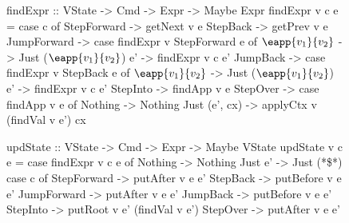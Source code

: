 \begin{figure}[t]
\begin{mcode}
findExpr :: VState -> Cmd -> Expr -> Maybe Expr
findExpr v c e = case c of
  StepForward -> getNext v e
  StepBack    -> getPrev v e
  JumpForward -> case findExpr v StepForward e of
    $\eapp{v_1}{v_2}$ -> Just ($\eapp{v_1}{v_2}$)
    e'   -> findExpr v c e'
  JumpBack    -> case findExpr v StepBack e of
    $\eapp{v_1}{v_2}$ -> Just ($\eapp{v_1}{v_2}$)
    e'   -> findExpr v c e'
  StepInto    -> findApp v e
  StepOver    -> case findApp v e of
    Nothing       -> Nothing
    Just (e', cx) -> applyCtx v (findVal v e') cx

updState :: VState -> Cmd -> Expr -> Maybe VState
updState v c e = case findExpr v c e of
  Nothing -> Nothing
  Just e' -> Just (*\$*) case c of
    StepForward -> putAfter  v e e'
    StepBack    -> putBefore v e e'
    JumpForward -> putAfter  v e e'
    JumpBack    -> putBefore v e e'
    StepInto    -> putRoot   v e' (findVal v e') 
    StepOver    -> putAfter  v e e'
\end{mcode}

\end{figure}
